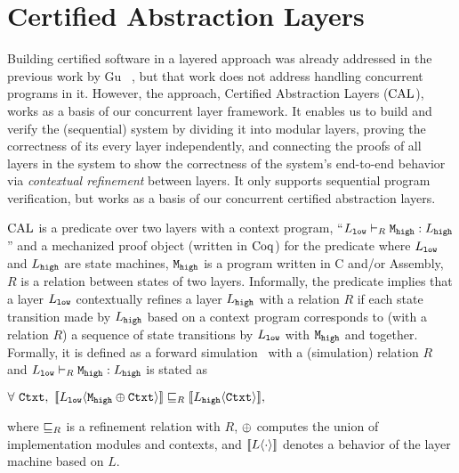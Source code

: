 \section{Certified Abstraction Layers}
\label{chapter:ccal:sec:cal}


Building certified software in a layered approach was already addressed in the previous work by Gu \etal~\cite{deepspec},
but that work does not address handling concurrent programs in it.
However, the approach, Certified Abstraction Layers ($\mathrm{CAL}$), works as a basis of our concurrent layer framework.
It enables us to build and verify the (sequential) system by dividing it into modular layers, 
proving the correctness of its every layer independently, and connecting the proofs of all layers in the system to show the correctness of the system's end-to-end behavior via \textit{contextual refinement} between layers. 
It only supports sequential program verification, but works as a basis of our concurrent certified abstraction layers.

$\mathrm{CAL}$ is a predicate over two layers with a context program, 
``$L_{{\mathrm{\texttt{low}}}} \vdash_{R} {\mathrm{\texttt{M}}}_{\mathrm{\texttt{high}}} : L_{{\mathrm{\texttt{high}}}}$'' 
and a mechanized proof object (written in $\mathrm{Coq}$) for the predicate where $L_{{\mathrm{\texttt{low}}}}$ and $L_{{\mathrm{\texttt{high}}}}$ are state machines, ${\mathrm{\texttt{M}}}_{\mathrm{\texttt{high}}}$ is a program written in C and/or Assembly, $R$ is a relation between states of two layers.
Informally, the predicate implies that 
a layer $L_{{\mathrm{\texttt{low}}}}$ contextually refines  a layer $L_{{\mathrm{\texttt{high}}}}$ with a relation $R$
 if each state transition made by $L_{{\mathrm{\texttt{high}}}}$ based on a context program  
 corresponds to (with a relation $R$)  a sequence of 
 state transitions by $L_{{\mathrm{\texttt{low}}}}$ with ${\mathrm{\texttt{M}}}_{{\mathrm{\texttt{high}}}}$ and   together.
 Formally, it is defined as a forward simulation~\cite{Lynch95,leroy09,Milner71,Park81} with a (simulation) relation $R$
 and  $L_{{\mathrm{\texttt{low}}}} \vdash_{R} {\mathrm{\texttt{M}}}_{{\mathrm{\texttt{high}}}}  : L_{{\mathrm{\texttt{high}}}}$ is stated as
 \begin{center}
$\forall\ \codeinmath{Ctxt},\ \sem{L_{\codeinmath{low}}}{\modulecompose{\codeinmath{M}_{\codeinmath{high}}}{\codeinmath{Ctxt}}} \refines_{R} \sem{L_{\codeinmath{high}}}{\codeinmath{Ctxt}},$
\end{center}
where $\sqsubseteq_{R}$ is a refinement relation with $R$, 
$\oplus$ computes the union 
 of implementation modules and contexts,
and $[\![{L} \langle {\cdot} \rangle]\!]$ denotes a  behavior of the layer machine based on $L$.


